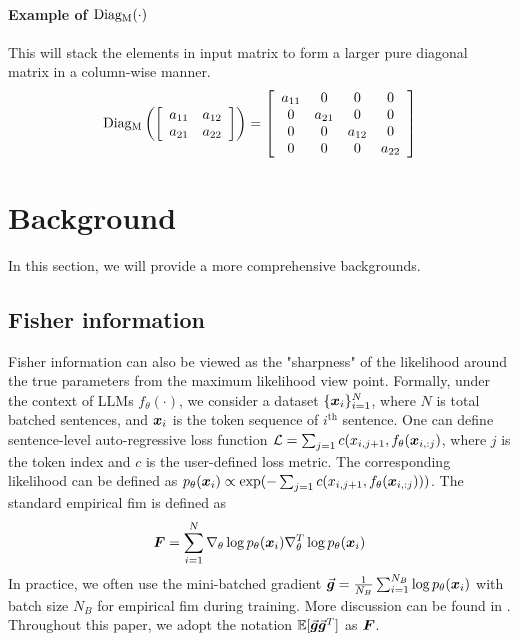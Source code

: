 \paragraph{Example of $\operatorname{Diag_M}(\cdot)$}
This will stack the elements in input matrix to form a larger pure diagonal matrix in a column-wise manner.
\begin{align*}
    \operatorname{Diag_M}\left(\left[\begin{array}{cc}
        a_{11} & a_{12}  \\
        a_{21} &  a_{22}
    \end{array}\right]\right) = \left[\begin{array}{cccc}
        a_{11} & 0 & 0 &0  \\
        0 & a_{21} & 0 & 0\\
        0&0&a_{12} & 0\\
        0&0&0&a_{22}
    \end{array}\right]
\end{align*}

\section{Background}
\label{app: background}
In this section, we will provide a more comprehensive backgrounds.

\subsection{Fisher information}
\label{subapp: background fisher information}
Fisher information can also be viewed as the "sharpness" of the likelihood around the true parameters from the maximum likelihood view point. 
Formally, under the context of LLMs $f_\theta(\cdot)$, we consider a dataset $\{{\bm{x}}_i\}_{i=1}^N$, where $N$ is total batched sentences, and ${\bm{x}}_i$ is the token sequence of $i^{\text{th}}$ sentence. One can define sentence-level auto-regressive loss function $\mathcal{L} = \sum_{j=1}c(x_{i,j+1}, f_{\theta}({\bm{x}}_{i,:j})$, where $j$ is the token index and $c$ is the user-defined loss metric. The corresponding likelihood can be defined as $p_\theta({\bm{x}}_i)\propto \exp(-\sum_{j=1}c(x_{i,j+1},f_{\theta}({\bm{x}}_{i,:j})))$. 
The standard empirical \gls{fim} is defined as 
\begin{align*}
    {\bm{F}} = \sum_{i=1}^N\nabla_\theta \log p_\theta({\bm{x}}_i)\nabla_\theta^T\log p_\theta({\bm{x}}_i)
\end{align*}
In practice, we often use the mini-batched gradient $\vec{\bm{g}} = \frac{1}{N_B}\sum_{i=1}^{N_B} \log p_\theta({\bm{x}}_i)$ with batch size $N_B$ for empirical \gls{fim} during training. More discussion can be found in \cite{lin2024can}.
Throughout this paper, we adopt the notation $\mathbb{E}[\vec{\bm{g}}\vec{\bm{g}}^T]$ as ${\bm{F}}$. 

